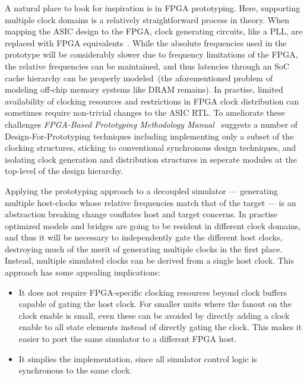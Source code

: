 A natural place to look for inspiration is in FPGA prototyping. Here,
supporting multiple clock domains is a relatively straightforward process in
theory. When mapping the ASIC design to the FPGA, clock generating circuits,
like a PLL, are replaced with FPGA equivalents~\cite{FPMM}. While the absolute
frequencies used in the prototype will be considerably slower due to frequency
limitations of the FPGA, the relative frequencies can be maintained, and thus
latencies through an SoC cache hierarchy can be properly modeled~(the
aforementioned problem of modeling off-chip memory systems like DRAM remains).
In practise, limited availability of clocking resources and restrictions in
FPGA clock distribution can sometimes require non-trivial changes to the ASIC
RTL. To ameliorate these challenges \emph{FPGA-Based Prototyping Methodology
Manual}~\cite{FPMM} suggests a number of Design-For-Prototyping techniques
including implementing only a subset of the clocking structures, sticking to
conventional synchronous design techniques, and isolating clock generation and
distribution structures in seperate modules at the top-level of the design
hierarchy.

Applying the prototyping approach to a decoupled simulator --- generating
multiple host-clocks whose relative frequencies match that of the target --- is
an abstraction breaking change conflates host and target concerns.  In practise
optimized models and bridges are going to be resident in different clock
domains, and thus it will be necessary to independently gate the different
host clocks, destroying much of the merit of generating multiple clocks in
the first place. Instead, multiple simulated clocks can be derived from a single
host clock. This approach has some appealing implications:
\begin{itemize}
 \item It does not require FPGA-specific clocking resources beyond clock
 buffers capable of gating the host clock. For smaller units where the fanout
 on the clock enable is small, even these can be avoided by directly adding a clock enable
 to all state elements instead of directly gating the clock. This makes it easier
 to port the same simulator to a different FPGA host.

 \item It simplies the implementation, since all simulator control logic is synchronous to 
 the same clock.
\end{itemize}

